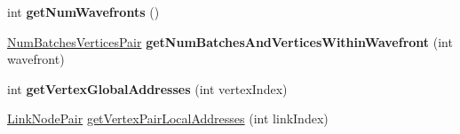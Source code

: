 \begin{DoxyCompactItemize}
int {\bfseries get\+Num\+Wavefronts} ()
\item 
\mbox{\label{classbtSoftBodyLinkDataDX11SIMDAware_a0f485c42cb17b28a2aff1d4abb0f45c2}} 
\hyperlink{structbtSoftBodyLinkDataDX11SIMDAware_1_1NumBatchesVerticesPair}{Num\+Batches\+Vertices\+Pair} {\bfseries get\+Num\+Batches\+And\+Vertices\+Within\+Wavefront} (int wavefront)
\item 
\mbox{\label{classbtSoftBodyLinkDataDX11SIMDAware_adf129c8a7ed3090c71dd94c31c12a410}} 
int {\bfseries get\+Vertex\+Global\+Addresses} (int vertex\+Index)
\item 
\hyperlink{classbtSoftBodyLinkData_1_1LinkNodePair}{Link\+Node\+Pair} \hyperlink{classbtSoftBodyLinkDataDX11SIMDAware_ac3eb087312fd7433a9f32f8eee8e40a3}{get\+Vertex\+Pair\+Local\+Addresses} (int link\+Index)
\end{DoxyCompactItemize}
